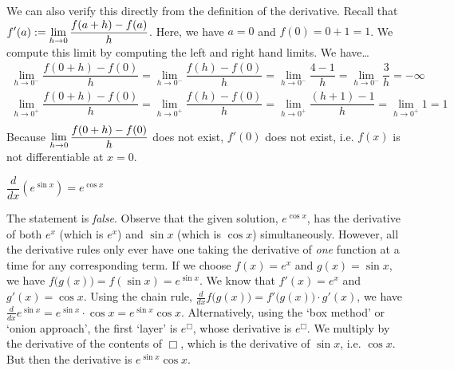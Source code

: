 \documentclass[11pt,letterpaper]{article}
\begin{document}
We can also verify this directly from the definition of the derivative. Recall that $\displaystyle f'(a):= \lim_{h \to 0} \dfrac{f(a + h) - f(a)}{h}$. Here, we have $a= 0$ and $f(0)= 0 + 1= 1$. We compute this limit by computing the left and right hand limits. We have\dots
	\[
	\begin{aligned}
	\lim_{h \to 0^-} \dfrac{f(0 + h) - f(0)}{h}= \lim_{h \to 0^-} \dfrac{f(h) - f(0)}{h}= \lim_{h \to 0^-} \dfrac{4 - 1}{h}= \lim_{h \to 0^-} \dfrac{3}{h}= -\infty \\[0.3cm]
	\lim_{h \to 0^+} \dfrac{f(0 + h) - f(0)}{h}= \lim_{h \to 0^+} \dfrac{f(h) - f(0)}{h}= \lim_{h \to 0^+} \dfrac{(h + 1) - 1}{h}= \lim_{h \to 0^+} 1= 1 \\
	\end{aligned}
	\]
Because $\displaystyle \lim_{h \to 0} \dfrac{f(0 + h) - f(0)}{h}$ does not exist, $f'(0)$ does not exist, i.e. $f(x)$ is not differentiable at $x= 0$. \pvspace{1.3cm}



 $\dfrac{d}{dx} \left( e^{\sin x} \right)= e^{\cos x}$ \pspace

\sol The statement is \textit{false}. Observe that the given solution, $e^{\cos x}$, has the derivative of both $e^x$ (which is $e^x$) and $\sin x$ (which is $\cos x$) simultaneously. However, all the derivative rules only ever have one taking the derivative of \textit{one} function at a time for any corresponding term. If we choose $f(x)= e^x$ and $g(x)= \sin x$, we have $f \big( g(x) \big)= f(\sin x)= e^{\sin x}$. We know that $f'(x)= e^x$ and $g'(x)= \cos x$. Using the chain rule, $\tfrac{d}{dx} f \big( g(x) \big)= f' \big( g(x) \big) \cdot g'(x)$, we have $\tfrac{d}{dx} e^{\sin x}= e^{\sin x} \cdot \cos x= e^{\sin x} \cos x$. Alternatively, using the `box method' or `onion approach', the first `layer' is $e^\Box{}$, whose derivative is $e^\Box{}$. We multiply by the derivative of the contents of $\Box{}$, which is the derivative of $\sin x$, i.e. $\cos x$. But then the derivative is $e^{\sin x} \cos x$. \pvspace{1.3cm}
\end{document}

